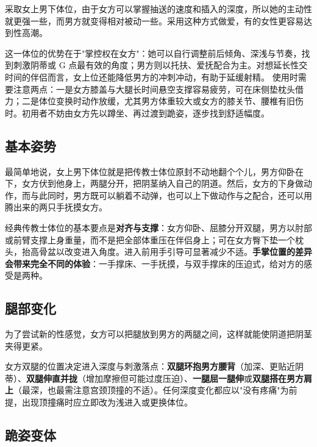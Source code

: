 \documentclass[12pt,UTF8]{ctexbook}
\begin{document}
采取女上男下体位，由于女方可以掌握抽送的速度和插入的深度，所以她的主动性就更强一些，而男方就变得相对被动一些。采用这种方式做爱，有的女性更容易达到性高潮。

\vspace{0.5em}

这一体位的优势在于"掌控权在女方"：她可以自行调整前后倾角、深浅与节奏，找到刺激阴蒂或 G 点最有效的角度；男方则以托扶、爱抚配合为主。对想延长性交时间的伴侣而言，女上位还能降低男方的冲刺冲动，有助于延缓射精。
使用时需要注意两点：一是女方膝盖与大腿长时间悬空支撑容易疲劳，可在床侧垫枕头借力；二是体位变换时动作放缓，尤其男方体重较大或女方的膝关节、腰椎有旧伤时。初用者不妨由女方先以蹲坐、再过渡到跪姿，逐步找到舒适幅度。

\subsection{基本姿势}

最简单地说，女上男下体位就是把传教士体位原封不动地翻个个儿，男方仰卧在下，女方伏到他身上，两腿分开，把阴茎纳入自己的阴道。然后，女方的下身做动作，而与此同时，男方既可以躺着不动弹，也可以上下做动作与之配合，还可以用腾出来的两只手抚摸女方。

\vspace{0.5em}

经典传教士体位的基本要点是\textbf{对齐与支撑}：女方仰卧、屈膝分开双腿，男方以肘部或前臂支撑上身重量，而不是把全部体重压在伴侣身上；可在女方臀下垫一个枕头，抬高骨盆以改变进入角度。进入前用手引导可显著减少不适。\textbf{手掌位置的差异会带来完全不同的体验}：一手撑床、一手抚摸，与双手撑床的压迫式，给对方的感受是两种。

\subsection{腿部变化}

为了尝试新的性感觉，女方可以把腿放到男方的两腿之间，这样就能使阴道把阴茎夹得更紧。

\vspace{0.5em}

女方双腿的位置决定进入深度与刺激落点：\textbf{双腿环抱男方腰背}（加深、更贴近阴蒂）、\textbf{双腿伸直并拢}（增加摩擦但可能过度压迫）、\textbf{一腿屈一腿伸}或\textbf{双腿搭在男方肩上}（最深，也最需注意宫颈顶撞的不适）。任何深度变化都应以"没有疼痛"为前提，出现顶撞痛时应立即改为浅进入或更换体位。

\subsection{跪姿变体}
\end{document}
